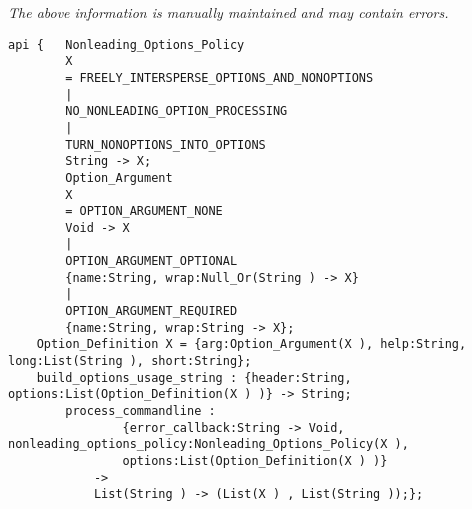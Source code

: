 \label{api:Process\_Commandline}

{\tiny \it The above information is manually maintained and may contain errors.}
\begin{verbatim}
api {   Nonleading_Options_Policy
        X
        = FREELY_INTERSPERSE_OPTIONS_AND_NONOPTIONS
        |
        NO_NONLEADING_OPTION_PROCESSING
        |
        TURN_NONOPTIONS_INTO_OPTIONS
        String -> X;
        Option_Argument
        X
        = OPTION_ARGUMENT_NONE
        Void -> X
        |
        OPTION_ARGUMENT_OPTIONAL
        {name:String, wrap:Null_Or(String ) -> X}
        |
        OPTION_ARGUMENT_REQUIRED
        {name:String, wrap:String -> X};
    Option_Definition X = {arg:Option_Argument(X ), help:String, long:List(String ), short:String};
    build_options_usage_string : {header:String, options:List(Option_Definition(X ) )} -> String;
        process_commandline :
                {error_callback:String -> Void, nonleading_options_policy:Nonleading_Options_Policy(X ),
                options:List(Option_Definition(X ) )}
            ->
            List(String ) -> (List(X ) , List(String ));};
\end{verbatim}
